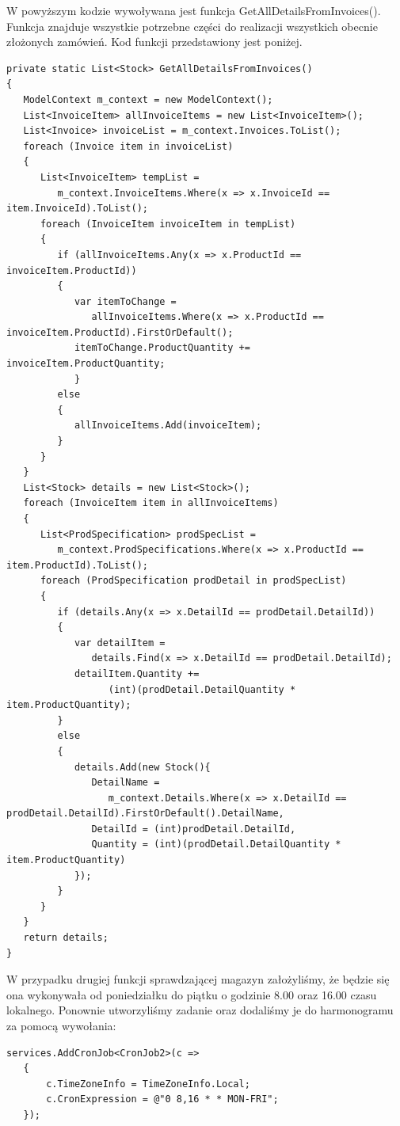 \documentclass{article}
\begin{document}
W powyższym kodzie wywoływana jest funkcja GetAllDetailsFromInvoices(). Funkcja znajduje wszystkie
potrzebne części do realizacji wszystkich obecnie złożonych zamówień. Kod funkcji przedstawiony jest
poniżej.
\begin{lstlisting}[style=sharpc,caption={Funkcja GetAllDetailsFromInvoices()},breaklines=true,showstringspaces=false]
private static List<Stock> GetAllDetailsFromInvoices()
{
   ModelContext m_context = new ModelContext();
   List<InvoiceItem> allInvoiceItems = new List<InvoiceItem>();
   List<Invoice> invoiceList = m_context.Invoices.ToList();
   foreach (Invoice item in invoiceList)
   {
      List<InvoiceItem> tempList = 
         m_context.InvoiceItems.Where(x => x.InvoiceId == item.InvoiceId).ToList();
      foreach (InvoiceItem invoiceItem in tempList)
      {
         if (allInvoiceItems.Any(x => x.ProductId == invoiceItem.ProductId))
         {
            var itemToChange = 
               allInvoiceItems.Where(x => x.ProductId == invoiceItem.ProductId).FirstOrDefault();
            itemToChange.ProductQuantity += invoiceItem.ProductQuantity;
            }
         else
         {
            allInvoiceItems.Add(invoiceItem);
         }
      }
   }
   List<Stock> details = new List<Stock>();
   foreach (InvoiceItem item in allInvoiceItems)
   {
      List<ProdSpecification> prodSpecList = 
         m_context.ProdSpecifications.Where(x => x.ProductId == item.ProductId).ToList();
      foreach (ProdSpecification prodDetail in prodSpecList)
      {
         if (details.Any(x => x.DetailId == prodDetail.DetailId))
         {
            var detailItem = 
               details.Find(x => x.DetailId == prodDetail.DetailId);
            detailItem.Quantity += 
                  (int)(prodDetail.DetailQuantity * item.ProductQuantity);
         }
         else
         {
            details.Add(new Stock(){
               DetailName = 
                  m_context.Details.Where(x => x.DetailId == prodDetail.DetailId).FirstOrDefault().DetailName,
               DetailId = (int)prodDetail.DetailId,
               Quantity = (int)(prodDetail.DetailQuantity * item.ProductQuantity)
            });
         }
      }
   }
   return details;
}
\end{lstlisting}
W przypadku drugiej funkcji sprawdzającej magazyn założyliśmy, że będzie się ona wykonywała od
poniedziałku do piątku o godzinie 8.00 oraz 16.00 czasu lokalnego. Ponownie utworzyliśmy zadanie
oraz dodaliśmy je do harmonogramu za pomocą wywołania:
\begin{lstlisting}[style=sharpc,caption={Dodanie zadania do harmonogramu},showstringspaces=false]
   services.AddCronJob<CronJob2>(c =>
   {
       c.TimeZoneInfo = TimeZoneInfo.Local;
       c.CronExpression = @"0 8,16 * * MON-FRI";
   });
\end{lstlisting}
\end{document}
